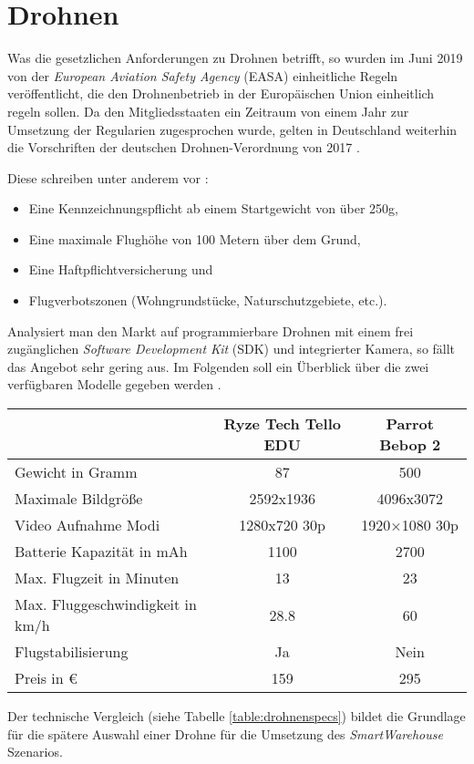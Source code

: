 \section{Drohnen} \label{drohnen}

Was die gesetzlichen Anforderungen zu Drohnen betrifft, so wurden im Juni 2019 von der \textit{European Aviation Safety Agency} (EASA) einheitliche Regeln veröffentlicht, die den Drohnenbetrieb in der Europäischen Union einheitlich regeln sollen. Da den Mitgliedsstaaten ein Zeitraum von einem Jahr zur Umsetzung der Regularien zugesprochen wurde, gelten in Deutschland weiterhin die Vorschriften der deutschen Drohnen-Verordnung von 2017 \cite{EASA.2019}.

Diese schreiben unter anderem vor \cite{Drohnen.de.2020}:
\begin{itemize}
	\item Eine Kennzeichnungspflicht ab einem Startgewicht von über 250g,
	\item Eine maximale Flughöhe von 100 Metern über dem Grund,
	\item Eine Haftpflichtversicherung und
	\item Flugverbotszonen (Wohngrundstücke, Naturschutzgebiete, etc.).
\end{itemize}

Analysiert man den Markt auf programmierbare Drohnen mit einem frei zugänglichen \textit{Software Development Kit} (SDK) und integrierter Kamera, so fällt das Angebot sehr gering aus. Im Folgenden soll ein Überblick über die zwei verfügbaren Modelle gegeben werden \cite{RyzeRobotics.2020, Parrot.20200520}.

\begin{center}
	\begin{tabular}[H]{l|c|c}
		& Ryze Tech Tello EDU & Parrot Bebop 2\\
		\hline
		Gewicht in Gramm & 87 & 500 \\
		Maximale Bildgröße & 2592x1936 & 4096x3072 \\
		Video Aufnahme Modi & 1280x720 30p & 1920×1080 30p \\
		Batterie Kapazität in mAh & 1100 & 2700 \\
		Max. Flugzeit in Minuten & 13 & 23 \\
		Max. Fluggeschwindigkeit in km/h & 28.8 & 60 \\
		Flugstabilisierung & Ja & Nein \\
		Preis in € & 159 & 295
	\end{tabular}
	\label{table:drohnenspecs}
\end{center}

Der technische Vergleich (siehe Tabelle \ref{table:drohnenspecs}) bildet die Grundlage für die spätere Auswahl einer Drohne für die Umsetzung des \textit{SmartWarehouse} Szenarios.